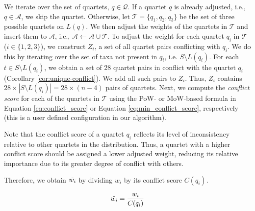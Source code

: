 \documentclass[runningheads]{llncs}
\newcommand{\addb}[1]{{\color{red} #1}}
\begin{document}
We iterate over the set of quartets, $q \in \mathcal{Q}$. If a quartet $q$ is already adjusted, i.e., $ q \in \mathcal{A} $, we skip the quartet. Otherwise, let $ \mathcal{T} = \{q_1, q_2, q_3\}$ be the set of three possible quartets on $L(q)$. %
We then adjust the weights of the quartets in $\mathcal{T}$ and insert them to $\mathcal{A}$, i.e., $\mathcal{A} \leftarrow \mathcal{A} \cup \mathcal{T}$. To adjust the weight for each quartet $q_i$ in $\mathcal{T}$ ($i \in \{ 1,2,3\}$), we construct $Z_i$, a set of all quartet pairs conflicting with $q_i$. %
We do this by iterating over the set of taxa not present in $q_i$, i.e. $S \setminus L(q_i)$. 
For each $t \in S \setminus L(q_i)$, we obtain a set of 28 quartet pairs in conflict with the quartet $q_i$ (Corollary \ref{cor:unique-conflict}). We add all such pairs to $Z_i$. Thus, $Z_i$ contains $28\times|S \setminus L(q_i)| = 28 \times (n-4)$ pairs of quartets. Next, we compute the \textit{conflict score} for each of the quartets in $\mathcal{T}$ using the PoW- or MoW-based formula in Equation \eqref{eq:conflict_score} or Equation \eqref{eq:min_conflict_score}, respectively (this is a user defined configuration in our algorithm).


Note that the conflict score of a quartet $q_i$ reflects its level of inconsistency relative to other quartets in the distribution. Thus, a quartet with a higher conflict score should be assigned a lower adjusted weight, reducing its relative importance due to its greater degree of conflict with others.


Therefore, we obtain $\Tilde{w_i}$ by dividing $ w_i $ %
by its conflict score $C(q_i)$.

$$
\Tilde{w_i} = \frac{w_i}{C(q_i)}
$$
\end{document}
